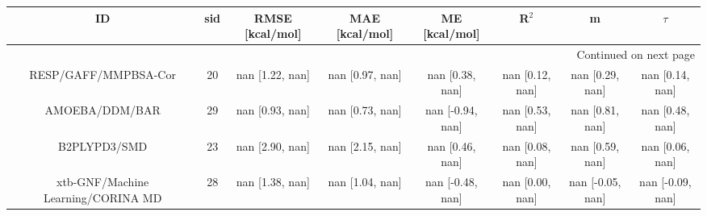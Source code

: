 \documentclass[8pt]{article}
\begin{document}
\begin{center}
\begin{footnotesize}
\begin{longtable}{|cccccccc|}
\toprule
                                 ID & sid &  RMSE [kcal/mol] &   MAE [kcal/mol] &     ME [kcal/mol] &            R$^2$ &                 m &            $\tau$ \\
\midrule
\endhead
\midrule
\multicolumn{8}{r}{{Continued on next page}} \\
\midrule
\endfoot

\bottomrule
\endlastfoot
               RESP/GAFF/MMPBSA-Cor &  20 &  nan [1.22, nan] &  nan [0.97, nan] &   nan [0.38, nan] &  nan [0.12, nan] &   nan [0.29, nan] &   nan [0.14, nan] \\
                     AMOEBA/DDM/BAR &  29 &  nan [0.93, nan] &  nan [0.73, nan] &  nan [-0.94, nan] &  nan [0.53, nan] &   nan [0.81, nan] &   nan [0.48, nan] \\
                       B2PLYPD3/SMD &  23 &  nan [2.90, nan] &  nan [2.15, nan] &   nan [0.46, nan] &  nan [0.08, nan] &   nan [0.59, nan] &   nan [0.06, nan] \\
 xtb-GNF/Machine Learning/CORINA MD &  28 &  nan [1.38, nan] &  nan [1.04, nan] &  nan [-0.48, nan] &  nan [0.00, nan] &  nan [-0.05, nan] &  nan [-0.09, nan] \\
\end{longtable}
\end{footnotesize}
\end{center}
\end{document}
